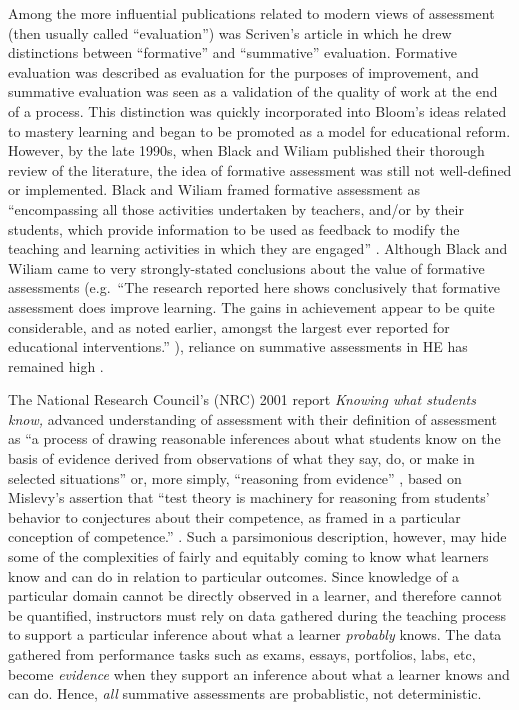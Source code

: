 \documentclass[
]{book}
\begin{document}
Among the more influential publications related to modern views of assessment (then usually called ``evaluation'') was Scriven's \citeyearpar{scrivenMethodologyEvaluation1967} article in which he drew distinctions between ``formative'' and ``summative'' evaluation. Formative evaluation was described as evaluation for the purposes of improvement, and summative evaluation was seen as a validation of the quality of work at the end of a process. This distinction was quickly incorporated into Bloom's \citeyearpar{bloomLearningMasteryInstruction1968} ideas related to mastery learning and began to be promoted as a model for educational reform. However, by the late 1990s, when Black and Wiliam \citeyearpar{blackAssessmentClassroomLearning1998} published their thorough review of the literature, the idea of formative assessment was still not well-defined or implemented. Black and Wiliam framed formative assessment as ``encompassing all those activities undertaken by teachers, and/or by their students, which provide information to be used as feedback to modify the teaching and learning activities in which they are engaged'' \citeyearpar[p.~7-8]{blackAssessmentClassroomLearning1998}. Although Black and Wiliam came to very strongly-stated conclusions about the value of formative assessments (e.g.~``The research reported here shows conclusively that formative assessment does improve learning. The gains in achievement appear to be quite considerable, and as noted earlier, amongst the largest ever reported for educational interventions.'' \citeyearpar[p.~61]{blackAssessmentClassroomLearning1998}), reliance on summative assessments in HE has remained high \citep[\citet{lipnevichWhatGradesMean2020}]{harlenSystematicReviewImpact2002}.

The National Research Council's (NRC) 2001 report \emph{Knowing what students know,} advanced understanding of assessment with their definition of assessment as ``a process of drawing reasonable inferences about what students know on the basis of evidence derived from observations of what they say, do, or make in selected situations'' \citep[p.~112]{pellegrinoKnowingWhatStudents2001} or, more simply, ``reasoning from evidence'' \citep[p.~43]{pellegrinoKnowingWhatStudents2001}, based on Mislevy's assertion that ``test theory is machinery for reasoning from students' behavior to conjectures about their competence, as framed in a particular conception of competence.'' \citeyearpar[ p.~4]{mislevyTestTheoryReconcieved1994}. Such a parsimonious description, however, may hide some of the complexities of fairly and equitably coming to know what learners know and can do in relation to particular outcomes. Since knowledge of a particular domain cannot be directly observed in a learner, and therefore cannot be quantified, instructors must rely on data gathered during the teaching process to support a particular inference about what a learner \emph{probably} knows. The data gathered from performance tasks such as exams, essays, portfolios, labs, etc, become \emph{evidence} when they support an inference about what a learner knows and can do. Hence, \emph{all} summative assessments are probablistic, not deterministic.
\end{document}
